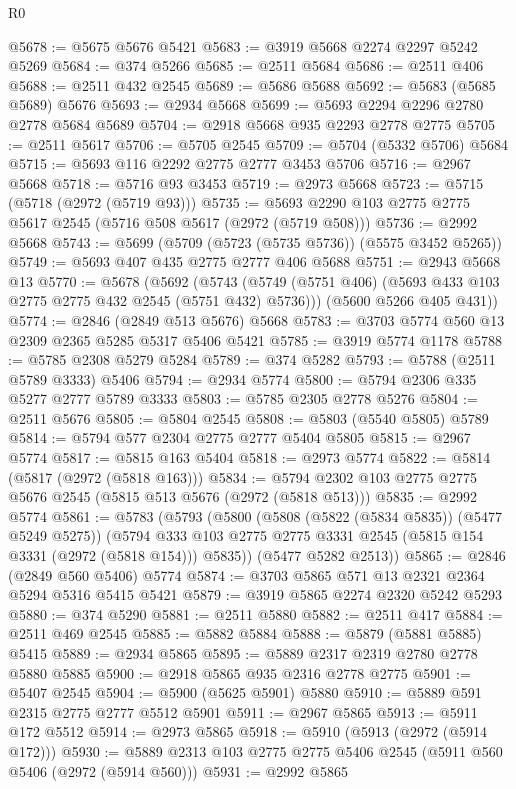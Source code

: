 \begin{lexlean}{R0}
\begin{coremodule}
@5678 := @5675 @5676 @5421
@5683 := @3919 @5668 @2274 @2297 @5242 @5269
@5684 := @374 @5266
@5685 := @2511 @5684
@5686 := @2511 @406
@5688 := @2511 @432 @2545
@5689 := @5686 @5688
@5692 := @5683 (@5685 @5689) @5676
@5693 := @2934 @5668
@5699 := @5693 @2294 @2296 @2780 @2778 @5684 @5689
@5704 := @2918 @5668 @935 @2293 @2778 @2775
@5705 := @2511 @5617
@5706 := @5705 @2545
@5709 := @5704 (@5332 @5706) @5684
@5715 := @5693 @116 @2292 @2775 @2777 @3453 @5706
@5716 := @2967 @5668
@5718 := @5716 @93 @3453
@5719 := @2973 @5668
@5723 := @5715 (@5718 (@2972 (@5719 @93)))
@5735 := @5693 @2290 @103 @2775 @2775 @5617 @2545 (@5716 @508 @5617 (@2972 (@5719 @508)))
@5736 := @2992 @5668
@5743 := @5699 (@5709 (@5723 (@5735 @5736)) (@5575 @3452 @5265))
@5749 := @5693 @407 @435 @2775 @2777 @406 @5688
@5751 := @2943 @5668 @13
@5770 := @5678
    (@5692
      (@5743 (@5749 (@5751 @406) (@5693 @433 @103 @2775 @2775 @432 @2545 (@5751 @432) @5736)))
      (@5600 @5266 @405 @431))
@5774 := @2846 (@2849 @513 @5676) @5668
@5783 := @3703 @5774 @560 @13 @2309 @2365 @5285 @5317 @5406 @5421
@5785 := @3919 @5774 @1178
@5788 := @5785 @2308 @5279 @5284
@5789 := @374 @5282
@5793 := @5788 (@2511 @5789 @3333) @5406
@5794 := @2934 @5774
@5800 := @5794 @2306 @335 @5277 @2777 @5789 @3333
@5803 := @5785 @2305 @2778 @5276
@5804 := @2511 @5676
@5805 := @5804 @2545
@5808 := @5803 (@5540 @5805) @5789
@5814 := @5794 @577 @2304 @2775 @2777 @5404 @5805
@5815 := @2967 @5774
@5817 := @5815 @163 @5404
@5818 := @2973 @5774
@5822 := @5814 (@5817 (@2972 (@5818 @163)))
@5834 := @5794 @2302 @103 @2775 @2775 @5676 @2545 (@5815 @513 @5676 (@2972 (@5818 @513)))
@5835 := @2992 @5774
@5861 := @5783
    (@5793
      (@5800
        (@5808 (@5822 (@5834 @5835)) (@5477 @5249 @5275))
        (@5794 @333 @103 @2775 @2775 @3331 @2545 (@5815 @154 @3331 (@2972 (@5818 @154))) @5835))
      (@5477 @5282 @2513))
@5865 := @2846 (@2849 @560 @5406) @5774
@5874 := @3703 @5865 @571 @13 @2321 @2364 @5294 @5316 @5415 @5421
@5879 := @3919 @5865 @2274 @2320 @5242 @5293
@5880 := @374 @5290
@5881 := @2511 @5880
@5882 := @2511 @417
@5884 := @2511 @469 @2545
@5885 := @5882 @5884
@5888 := @5879 (@5881 @5885) @5415
@5889 := @2934 @5865
@5895 := @5889 @2317 @2319 @2780 @2778 @5880 @5885
@5900 := @2918 @5865 @935 @2316 @2778 @2775
@5901 := @5407 @2545
@5904 := @5900 (@5625 @5901) @5880
@5910 := @5889 @591 @2315 @2775 @2777 @5512 @5901
@5911 := @2967 @5865
@5913 := @5911 @172 @5512
@5914 := @2973 @5865
@5918 := @5910 (@5913 (@2972 (@5914 @172)))
@5930 := @5889 @2313 @103 @2775 @2775 @5406 @2545 (@5911 @560 @5406 (@2972 (@5914 @560)))
@5931 := @2992 @5865

\end{coremodule}
\end{lexlean}
